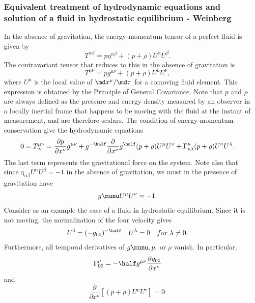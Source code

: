 \subsubsection{Equivalent treatment of hydrodynamic equations and solution of a fluid in hydrostatic equilibrium - Weinberg}
In the absence of gravitation, the energy-momentum tensor of a perfect fluid is given by
\begin{equation}
	T^{\alpha \beta} = p \eta^{\alpha \beta} + (p + \rho ) U^\alpha U^\beta. 
\end{equation}
The contravariant tensor that reduces to this in the absence of gravitation is
\begin{equation}
	T^{\mu \nu} = p g^{\mu \nu} + (p + \rho) U^\mu U^\nu,
\end{equation}
where $U^\mu$ is the local value of $\md x^\mu/\md \tau$ for a comoving fluid element. This expression is obtained by the Principle of General Covariance. Note that $p$ and $\rho$ are always defined as the pressure and energy density measured by an observer in a locally inertial frame that happens to be moving with the fluid at the instant of measurement, and are therefore scalars. The condition of energy-momentum conservation give the hydrodynamic equations
\begin{equation}
	0=T^{\mu \nu}_{;\nu} = \frac{\partial p}{\partial x^\nu} g^{\mu \nu} + g^{- \half} \frac{\partial}{\partial x^\nu} g^\half (p+\rho) U^\mu U^\nu + \Gamma^\mu_{\nu \lambda} (p +\rho) U^\nu U^\lambda.
\end{equation}
The last term represents the gravitational force on the system. Note also that since $\eta_{\alpha \beta}U^\alpha U^\beta =-1$ in the absence of gravitation, we must in the presence of gravitation have
\begin{equation}
	g\munu U^\mu U^\nu =-1.
\end{equation}
Consider as an example the case of a fluid in hydrostatic equilibrium. Since it is not moving, the normalization of the four velocity gives
\begin{equation}
	U^0 = (- g_{00})^{- \half} \quad U^\lambda=0 \quad for \; \lambda\neq 0.
\end{equation}
Furthermore, all temporal derivatives of $g\munu, p,$ or $\rho$ vanish. In particular,
\begin{equation}
	\Gamma^\mu_{00} = - \half g^{\mu \nu} \frac{\partial g_{00}}{\partial x^\nu}
\end{equation}
and
\begin{equation}
	\frac{\partial}{\partial x^\nu} \left[(p+\rho) U^\mu U^\nu\right]=0.
\end{equation}
